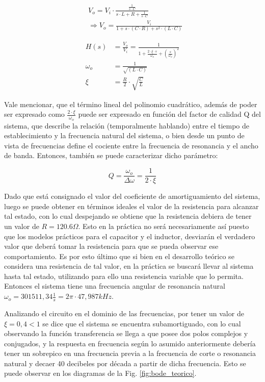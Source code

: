 \begin{align*}
    & V_o = V_i \cdot \frac{\frac{1}{s \cdot C}}{s \cdot L + R + \frac{1}{s \cdot C}} \\
    & \Rightarrow
    V_o = \frac{V_i}{1 + s \cdot (C \cdot R) + s^{2} \cdot (L \cdot C)}
\end{align*}

\begin{align}
    H(s) &= \frac{V_o}{V_i} = \frac{1}{1 + \frac{2 \cdot \xi \cdot s}{\omega_o} + \left( \frac{s}{\omega_o} \right)^{2}}
    \label{eq:Trans_PB}
    \\
    \omega_o &= \frac{1}{ \sqrt{(L \cdot C)} } \\
    \xi &= \frac{R}{2} \cdot \sqrt{\frac{C}{L}} 
\end{align}


Vale mencionar, que el t\'ermino lineal del polinomio cuadr\'atico, adem\'as de poder ser expresado como $\frac{2 \cdot \xi}{\omega_o}$ puede
ser expresado en funci\'on del factor de calidad Q del sistema, que describe la relaci\'on (temporalmente hablando) entre el tiempo de establecimiento
y la frecuencia natural del sistema, o bien desde un punto de vista de frecuencias define el cociente entre la frecuencia de resonancia y el ancho de banda.
Entonces, tambi\'en se puede caracterizar dicho par\'ametro:

\begin{equation}
    Q = \frac{\omega_o}{\Delta \omega} = \frac{1}{2 \cdot \xi}
\end{equation}

Dado que est\'a consignado el valor del coeficiente de amortiguamiento del sistema, luego se puede obtener en t\'erminos ideales el valor de la resistencia
para alcanzar tal estado, con lo cual despejando se obtiene que la resistencia debiera de tener un valor de $R = 120.6 \Omega$. Esto en la pr\'actica no ser\'a necesariamente
as\'i puesto que los modelos pr\'acticos para el capacitor y el inductor, desviar\'an el verdadero valor que deber\'a tomar la resistencia
para que se pueda observar ese comportamiento. Es por esto \'ultimo que si bien en el desarrollo te\'orico se considera una resistencia de tal valor, en la pr\'actica se buscar\'a
llevar al sistema hasta tal estado, utilizando para ello una resistencia variable que lo permita. Entonces el sistema tiene una frecuencia angular de resonancia natural $\omega_o = 301511,34 \frac{1}{s} = 2 \pi \cdot 47,987kHz$.

Analizando el circuito en el dominio de las frecuencias, por tener un valor de $\xi = 0,4 < 1$ se dice que el sistema se encuentra subamortiguado, con lo cual observando la funci\'on transferencia se 
llega a que posee dos polos complejos y conjugados, y la respuesta en frecuencia seg\'un lo asumido anteriormente deber\'ia tener un sobrepico en una frecuencia previa a la frecuencia de corte o resonancia natural y decaer
40 decibeles por d\'ecada a partir de dicha frecuencia. Esto se puede observar en los diagramas de la Fig. \ref{fig:bode_teorico}.

